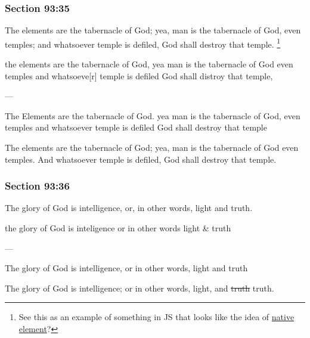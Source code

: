 	\subsubsection{Section 93:35} %
		\label{DC93-35}

		The elements are the tabernacle of God; yea, man is the tabernacle of God, even temples; and whatsoever temple is defiled, God shall destroy that temple.%
			\footnote{%
				See this as an example of something in JS that looks like the idea of \hyperref[NATIVEELEMENT]{native element}?
				}

		\begin{framed}
		\scriptsize
			\begin{compactdesc}
				\item[JSP] the elements are the tabernacle of God, yea man is the tabernacle of God even temples and whatsoeve[r] temple is defiled God shall distroy that temple,
				\item[BC] ---
				\item[RB2] The Elements are the tabernacle of God. yea man is the tabernacle of God, even temples and whatsoever temple is defiled God shall destroy that temple 
				\item[RB1] The elements are the tabernacle of God; yea, man is the tabernacle of God even temples. And whatsoever temple is defiled, God shall destroy that temple. 
			\end{compactdesc}
		\end{framed}

	\subsubsection{Section 93:36} %
		\label{DC93-36}

		The glory of God is intelligence, or, in other words, light and truth.

		\begin{framed}
		\scriptsize
			\begin{compactdesc}
				\item[JSP] the glory of God is inteligence or in other words light \& truth
				\item[BC] ---
				\item[RB2] The glory of God is intelligence, or in other words, light and truth 
				\item[RB1] The glory of God is intelligence; or in other words, light, and \sout{truth} truth. 
			\end{compactdesc}
		\end{framed}

